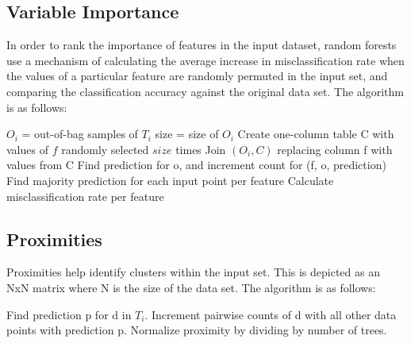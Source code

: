 \subsection{Variable Importance}
In order to rank the importance of features in the input dataset, random forests
use a mechanism of calculating the average increase in misclassification rate
when the values of a particular feature are randomly permuted in the input set,
and comparing the classification accuracy against the original data set. 
The algorithm is as follows:

 \begin{algorithm}[calculateVariableImportance$(R, F^*)$] \label{alg:variableImportance}
   \begin{algorithmic}[1]
     \State $O_i$ = out-of-bag samples of $T_i$
     \State size = size of $O_i$
       \State Create one-column table C with values of $f$ randomly selected $size$ times
       \State Join $(O_i,C)$ replacing column f with values from C
         \State Find prediction for o, and increment count for (f, o, prediction)
       \EndFor
     \EndFor
   \EndFor
   \State Find majority prediction for each input point per feature
   \State Calculate misclassification rate per feature
  \end{algorithmic}
 \end{algorithm}

\subsection{Proximities}
Proximities help identify clusters within the input set. This is depicted
as an NxN matrix where N is the size of the data set.
The algorithm is as follows:

 \begin{algorithm}[calculateProximity$(R, D^*)$] \label{alg:proximity}
   \begin{algorithmic}[1]
       \State Find prediction p for d in $T_i$. Increment pair\-wise counts of d with all other data points with prediction p. 
     \EndFor
   \EndFor
   \State Normalize proximity by dividing by number of trees.
  \end{algorithmic}
 \end{algorithm}

